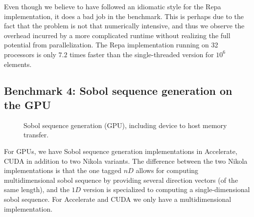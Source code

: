 Even though we believe to have followed an idiomatic style for the
Repa implementation, it does a bad job in the benchmark. This is
perhaps due to the fact that the problem is not that numerically
intensive, and thus we observe the overhead incurred by a more
complicated runtime without realizing the full potential from
parallelization. The Repa implementation running on 32 processors is
only $7.2$ times faster than the single-threaded version for $10^6$
elements.

\subsection{Benchmark 4: Sobol sequence generation on the GPU}
\begin{figure}
	\centering
\begin{adjustbox}{minipage=1.3\textwidth,margin=0pt \smallskipamount,center}
\end{adjustbox}
  \caption{Sobol sequence generation (GPU), including device to host memory transfer.}
\label{fig:sobol-gpu}
\end{figure}

For GPUs, we have Sobol sequence generation implementations in
Accelerate, CUDA in addition to two Nikola variants. The difference
between the two Nikola implementations is that the one tagged $nD$
allows for computing multidimensional sobol sequence by providing
several direction vectors (of the same length), and the $1D$ version
is specialized to computing a single-dimensional sobol sequence. For
Accelerate and CUDA we only have a multidimensional implementation.

